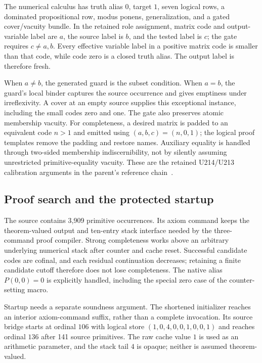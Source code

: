 The numerical calculus has truth alias $0$, target $1$, seven logical
rows, a dominated propositional row, modus ponens, generalization, and a
gated cover/vacuity bundle. In the retained role assignment, matrix code
and output-variable label are $a$, the source label is $b$, and the tested
label is $c$; the gate requires $c\ne a,b$. Every effective variable label
in a positive matrix code is smaller than that code, while code zero is
a closed truth alias. The output label is therefore fresh.

When $a\ne b$, the generated guard is the subset condition. When $a=b$,
the guard's local binder captures the source occurrence and gives
emptiness under irreflexivity. A cover at an empty source supplies this
exceptional instance, including the small codes zero and one. The gate
also preserves atomic membership vacuity. For completeness, a desired
matrix is padded to an equivalent code $n>1$ and emitted using
$(a,b,c)=(n,0,1)$; the logical proof templates remove the padding and
restore names. Auxiliary equality is handled through two-sided membership
indiscernibility, not by silently assuming unrestricted primitive-equality
vacuity. These are the retained U214/U213 calibration arguments in the
parent's reference chain~\cite{joint}.

\subsection{Proof search and the protected startup}

The source contains 3,909 primitive occurrences. Its axiom command keeps
the theorem-valued output and ten-entry stack interface needed by the
three-command proof compiler. Strong completeness works above an arbitrary
underlying numerical stack after counter and cache reset. Successful
candidate codes are cofinal, and each residual continuation decreases;
retaining a finite candidate cutoff therefore does not lose completeness.
The native alias $P(0,0)=0$ is explicitly handled, including the special
zero case of the counter-setting macro.

Startup needs a separate soundness argument. The shortened initializer
reaches an interior axiom-command suffix, rather than a complete invocation.
Its source bridge starts at ordinal $106$ with logical store
$(1,0,4,0,0,1,0,0,1)$ and reaches ordinal $136$ after 141 source primitives.
The raw cache value $1$ is used as an arithmetic parameter, and the stack
tail $4$ is opaque; neither is assumed theorem-valued.


